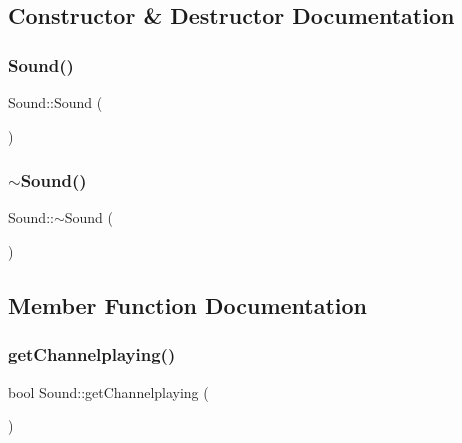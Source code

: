 \subsection{Constructor \& Destructor Documentation}
\hypertarget{class_ori_engine_1_1_sound_a539c205cdf06fe2c621fd77c37bcfac9}{}\label{class_ori_engine_1_1_sound_a539c205cdf06fe2c621fd77c37bcfac9} 
\subsubsection{\texorpdfstring{Sound()}{Sound()}}
{\footnotesize\ttfamily Sound\+::\+Sound (\begin{DoxyParamCaption}{ }\end{DoxyParamCaption})}

\hypertarget{class_ori_engine_1_1_sound_a0907389078bf740be2a5763366ad3376}{}\label{class_ori_engine_1_1_sound_a0907389078bf740be2a5763366ad3376} 
\subsubsection{\texorpdfstring{$\sim$\+Sound()}{~Sound()}}
{\footnotesize\ttfamily Sound\+::$\sim$\+Sound (\begin{DoxyParamCaption}{ }\end{DoxyParamCaption})}



\subsection{Member Function Documentation}
\hypertarget{class_ori_engine_1_1_sound_adf67b3e0608dc8e2a3e39ad92a086f8d}{}\label{class_ori_engine_1_1_sound_adf67b3e0608dc8e2a3e39ad92a086f8d} 
\subsubsection{\texorpdfstring{get\+Channelplaying()}{getChannelplaying()}}
{\footnotesize\ttfamily bool Sound\+::get\+Channelplaying (\begin{DoxyParamCaption}{ }\end{DoxyParamCaption})}

